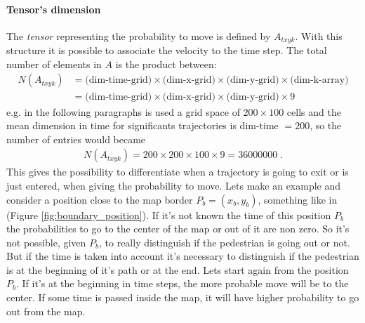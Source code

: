 \documentclass[class=article, crop=false]{standalone}
\begin{document}
\paragraph{Tensor's dimension}
The \emph{tensor} representing the probability to move is defined by $A_{t x y k}$.
With this structure it is possible to associate the velocity to the time step.
The total number of elements in $A$ is the product between:
\begin{equation*}
\begin{split}
N(A_{t xyk}) &= \mbox{(dim-time-grid)} \times \mbox{(dim-x-grid)} \times \mbox{(dim-y-grid)} \times \mbox{(dim-k-array)} \\
& = \mbox{(dim-time-grid)} \times \mbox{(dim-x-grid)} \times \mbox{(dim-y-grid)} \times 9
\end{split}
\end{equation*}
e.g. in the following paragraphs is used a grid space of $200\times100$ cells and the mean dimension in time for significants trajectories is dim-time $ = 200$, so the number of entries would became 
\begin{equation*}
\begin{split}
N(A_{t xyk})=200 \times 200\times100\times 9 = 36000000 \; .
\end{split}
\end{equation*}
This gives the possibility to differentiate when a trajectory is going to exit or is just entered, when giving the probability to move.
Lets make an example and consider a position close to the map border $P_b = (x_b, y_b)$, something like in (Figure \ref{fig:boundary_position}).
If it's not known the time of this position $P_b$ the probabilities to go to the center of the map or out of it are non zero.
So it's not possible, given $P_b$, to really distinguish if the pedestrian is going out or not.
But if the time is taken into account it's necessary to distinguish if the pedestrian is at the beginning of it's path or at the end.
Lets start again from the position $P_b$.
If it's at the beginning in time steps, the more probable move will be to the center.
If some time is passed inside the map, it will have higher probability to go out from the map.
\end{document}
